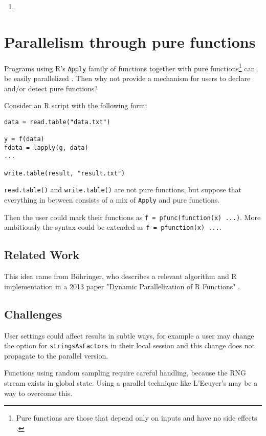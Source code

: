 \documentclass[12pt]{article}
\begin{document}
\begin{enumerate}
    \item 
\end{enumerate}

\section{Parallelism through pure functions}

Programs using R's \texttt{Apply} family of functions together with pure
functions\footnote{Pure functions are those that depend only on inputs and
have no side effects \cite{wiki:purefunc}.} can be easily parallelized
\cite{bohringer2013dynamic}. Then why not provide a mechanism for users to
declare and/or detect pure functions?

Consider an R script with the following form:
\begin{verbatim}
data = read.table("data.txt")

y = f(data)
fdata = lapply(g, data)
...

write.table(result, "result.txt")
\end{verbatim}

\texttt{read.table()} and \texttt{write.table()} are not pure functions,
but suppose that everything in between consists of a mix of \texttt{Apply} and pure functions.

Then the user could mark their functions as \texttt{f = pfunc(function(x)
{...})}. More ambitiously the syntax could be extended as \texttt{f =
pfunction(x) {...}}.

\subsection{Related Work}

This idea came from Böhringer, who describes a relevant algorithm and
R implementation in a 2013 paper "Dynamic Parallelization of R Functions"
\cite{bohringer2013dynamic}.

\subsection{Challenges}

User settings could affect results in subtle ways, for example a user may
change the option for \texttt{stringsAsFactors} in their local session and
this change does not propagate to the parallel version.

Functions using random sampling require careful handling, because the RNG
stream exists in global state. Using a parallel technique like L'Ecuyer's
may be a way to overcome this.
\end{document}
